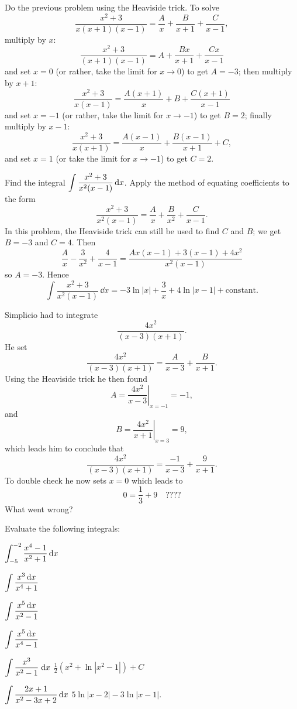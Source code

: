 \begin{multicols}{2}
\problem Do the previous problem using the Heaviside trick. %
\answer %
To solve
\[
\frac{x^2+3}{x(x+1)(x-1)} =
\frac{A}{x}+\frac{B}{x+1}+\frac{C}{x-1},
\]
multiply by $x$:
\[
\frac{x^2+3}{(x+1)(x-1)} = A+\frac{Bx}{x+1}+\frac{Cx}{x-1}
\]
and set $x=0$ (or rather, take the limit for $x\to0$)  to get $A=-3$; then multiply by $x+1$:
\[
\frac{x^2+3}{x(x-1)} = \frac{A(x+1)}{x}+B+\frac{C(x+1)}{x-1}
\]
and set $x=-1$
(or rather, take the limit for $x\to-1$) to get $B=2$; finally multiply by $x-1$:
\[
\frac{x^2+3}{x(x+1)} = \frac{A(x-1)}{x}+\frac{B(x-1)}{x+1}+ C,
\]
and set $x=1$ (or take the limit for $x\to-1$) to get $C=2$.
\endanswer

\problem\label{pblm:part-fracs-genrl} Find the integral $\DS %
\int\frac{x^2+3}{x^2(x-1)}\,\dd x$.
\answer %
Apply the method of equating coefficients to the form
\[
\frac{x^2+3}{x^2(x-1)}= \frac{A}{x}+\frac{B}{x^2}+\frac{C}{x-1}.
\]
In this problem, the Heaviside trick can still be used to find $C$
and $B$; we get $B=-3$ and $C=4$. Then
\[
\frac{A}{x}-\frac{3}{x^2}+\frac{4}{x-1}
=\frac{Ax(x-1)+3(x-1)+4x^2}{x^2(x-1)}
\]
so $A=-3$. Hence
\[
\int\frac{x^2+3}{x^2(x-1)}\,\dd x =-3\ln|x| +\frac{3}{x} +
4\ln|x-1| + \text{constant}.
\]
\endanswer

\problem Simplicio had to integrate %
\[
  \frac{4x^2}{(x-3)(x+1)}.
\]
He set
\[
\frac{4x^2}{(x-3)(x+1)} = \frac{A}{x-3} + \frac{B}{x+1}.
\]
Using the Heaviside trick he then found
\[
A = \left.\frac{4x^2}{x-3}\right|_{x=-1} = -1,
\]
and 
\[
B =  \left.\frac{4x^2}{x+1}\right|_{x=3} = 9,
\]
which leads him to conclude that 
\[
\frac{4x^2}{(x-3)(x+1)} = \frac{-1}{x-3} + \frac{9}{x+1}.
\]
To double check he now sets $x=0$ which leads to
\[
0 = \frac{1}{3} + 9 \quad  ????
\]
What went wrong?


\begin{center}
  \textcolor{badgerred}{Evaluate the following integrals:}
\end{center}

\problem $\displaystyle \int^{-2}_{-5} \frac{x^4-1}{ x^2+1} \,\mathrm{d} x$ %

\problem $\displaystyle \int \frac{x^3\,\mathrm{d} x}{x^4+1}$ %

\problem $\displaystyle \int \frac{x^5\,\mathrm{d} x}{x^2-1}$ %

\problem $\displaystyle \int \frac{x^5\,\mathrm{d} x}{x^4-1}$ %


\problem $\displaystyle \int \frac{x^3}{x^2-1}\;\mathrm{d} x$ %
\answer %
$\frac12(x^2+\ln|x^2-1|)+C$
\endanswer

\problem $\displaystyle \int \frac{2x+1}{x^2-3x+2}\,\mathrm{d} x$ %
\answer %
$5\ln|x-2| -3 \ln|x-1|$.
\endanswer


\end{multicols}
